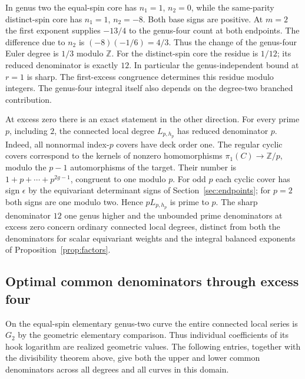 In genus two the equal-spin core has \(n_1=1\), \(n_2=0\), while the same-parity distinct-spin core has \(n_1=1\), \(n_2=-8\). Both base signs are positive. At \(m=2\) the first exponent supplies \(-13/4\) to the genus-four count at both endpoints. The difference due to \(n_2\) is \((-8)(-1/6)=4/3\). Thus the change of the genus-four Euler degree is \(1/3\) modulo \(\mathbb Z\). For the distinct-spin core the residue is \(1/12\); its reduced denominator is exactly \(12\). In particular the genus-independent bound at \(r=1\) is sharp. The first-excess congruence determines this residue modulo integers. The genus-four integral itself also depends on the degree-two branched contribution.

At excess zero there is an exact statement in the other direction. For every prime \(p\), including \(2\), the connected local degree \(L_{p,h_p}\) has reduced denominator \(p\). Indeed, all nonnormal index-\(p\) covers have deck order one. The regular cyclic covers correspond to the kernels of nonzero homomorphisms \(\pi_1(C)\to\mathbb Z/p\), modulo the \(p-1\) automorphisms of the target. Their number is \(1+p+\cdots+p^{2g-1}\), congruent to one modulo \(p\). For odd \(p\) each cyclic cover has sign \(\epsilon\) by the equivariant determinant signs of Section~\ref{sec:endpoints}; for \(p=2\) both signs are one modulo two. Hence \(pL_{p,h_p}\) is prime to \(p\). The sharp denominator \(12\) one genus higher and the unbounded prime denominators at excess zero concern ordinary connected local degrees, distinct from both the denominators for scalar equivariant weights and the integral balanced exponents of Proposition~\ref{prop:factors}.

\subsection{Optimal common denominators through excess four}

On the equal-spin elementary genus-two curve the entire connected local series is \(G_2\) by the geometric elementary comparison. Thus individual coefficients of its hook logarithm are realized geometric values. The following entries, together with the divisibility theorem above, give both the upper and lower common denominators across all degrees and all curves in this domain.

